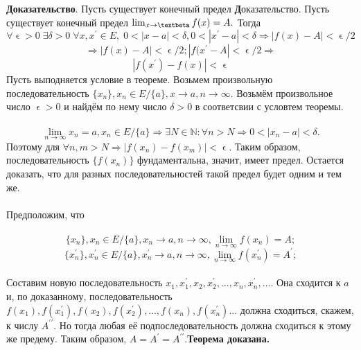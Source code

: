 \documentclass[12pt]{article}
\begin{document}
\indent \textbf{Доказательство}. Пусть существует конечный предел
   \textbf Доказательство. Пусть существует конечный предел $ \lim_{x \to \textbeta}f(x) = A.$ Тогда  
\begin{equation*}
    \forall \upvarepsilon > 0 \;  \exists \delta > 0 \;  \forall x, x^{\prime} \in E, \; 0 < |x - a| < \delta, 0 < |x^{\prime} - a| < \delta
    \Rightarrow |f(x) - A| < \upvarepsilon / 2
\end{equation*}
\begin{equation*}
    \Rightarrow |f(x) - A| < \upvarepsilon / 2  ; |f(x^{\prime} - A| < \upvarepsilon / 2 \Rightarrow
\end{equation*}
\begin{equation*}
     |f(x^{\prime}) - f(x)| < \upvarepsilon
\end{equation*}
\noindent Пусть выподняется условие в теореме. Возьмем произвольную последовательность $\{ x_{n} \}, x_{n} \in E / \{a\}, x \to a, n \to \infty$. Возьмём произвольное число $\upvarepsilon > 0$ и найдём по нему число $\delta > 0$ в соответсвии с условтем теоремы.\\\\
\begin{equation*}
     \lim_{n\to \infty}x_{n} = a, x_{n} \in E / \{a\} \Rightarrow \exists N \in \mathds{N} : \forall n > N \Rightarrow 0 < |x_{n} - a| < \delta.
\end{equation*}
\noindent Поэтому для $\forall n,m > N \Rightarrow |f(x_{n}) - f(x_{m})| < \upvarepsilon$. Таким образом, последовательность $\{ f(x_{n})\}$ фундаментальна, значит, имеет предел. Остается доказать, что для разных последовательностей такой предел будет одним и тем же.\\\\
\noindent Предположим, что \\\\
\begin{equation*}
    \{ x_{n} \}, x_{n} \in E/\{a\}, x_{n} \to a, n \to \infty, \lim_{n \to \infty}f(x_{n}) = A;
\end{equation*}
\begin{equation*}
    \{ x_{n}^{\prime} \}, x_{n}^{\prime} \in E/\{a\}, x_{n}^{\prime} \to a, n \to \infty, \lim_{n \to \infty}f(x_{n}^{\prime}) = A^{\prime};
\end{equation*}\\
\noindent Составим новую последовательность $x_{1}, x_{1}^{\prime}, x_{2}, x_{2}^{\prime},...,x_{n}, x_{n}^{\prime},...$. Она сходится к $a$ и, по доказанному, последовательность $f(x_{1}), f(x_{1}^{\prime}),f(x_{2}), f(x_{2}^{\prime}),...,f(x_{n}), f(x_{n}^{\prime})...$ должна сходиться, скажем, к числу $A^{\prime \prime}$. Но тогда любая её подпоследовательность должна сходиться к этому же предему. Таким образом, $A=A^{\prime}=A^{\prime \prime}$.\textbf{Теорема доказана.}
\end{document}
